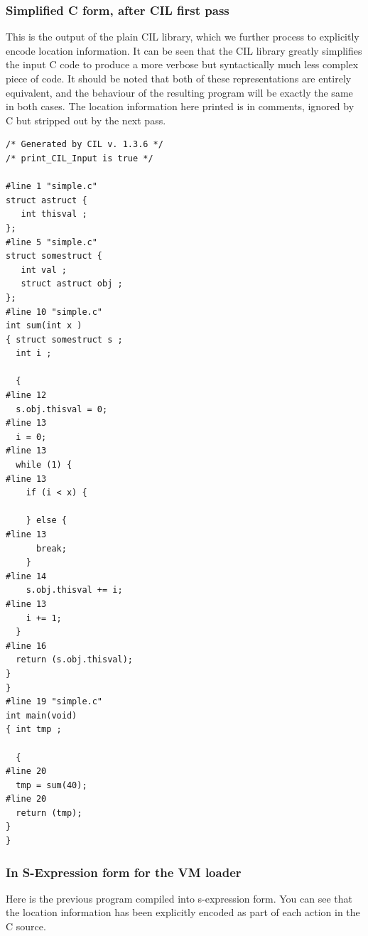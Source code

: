 \documentclass[10pt,a4paper]{report}
\begin{document}
\subsubsection{Simplified C form, after CIL first pass}
This is the output of the plain CIL library, which we further process to explicitly encode location information. It can be seen that the CIL library greatly simplifies the input C code to produce a more verbose but syntactically much less complex piece of code. It should be noted that both of these representations are entirely equivalent, and the behaviour of the resulting program will be exactly the same in both cases. The location information here printed is in comments, ignored by C but stripped out by the next pass.

\begin{verbatim}
/* Generated by CIL v. 1.3.6 */
/* print_CIL_Input is true */

#line 1 "simple.c"
struct astruct {
   int thisval ;
};
#line 5 "simple.c"
struct somestruct {
   int val ;
   struct astruct obj ;
};
#line 10 "simple.c"
int sum(int x ) 
{ struct somestruct s ;
  int i ;

  {
#line 12
  s.obj.thisval = 0;
#line 13
  i = 0;
#line 13
  while (1) {
#line 13
    if (i < x) {

    } else {
#line 13
      break;
    }
#line 14
    s.obj.thisval += i;
#line 13
    i += 1;
  }
#line 16
  return (s.obj.thisval);
}
}
#line 19 "simple.c"
int main(void) 
{ int tmp ;

  {
#line 20
  tmp = sum(40);
#line 20
  return (tmp);
}
}
\end{verbatim}

\subsubsection{In S-Expression form for the VM loader}
Here is the previous program compiled into s-expression form. You can see that the location information has been explicitly encoded as part of each action in the C source.
\end{document}

